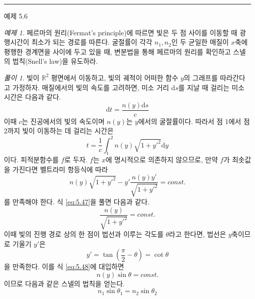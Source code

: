 \documentclass[chapter, oneside, b5paper]{oblivoir}
\theoremstyle{plain}
\theoremstyle{definition}
\theoremstyle{remark}
\newtheorem{example}{예제}[chapter]    %
\newtheorem*{solution}{풀이}
\begin{document}
\noindent\rule{\textwidth}{0.8pt} %
\vspace{1em} %

\begin{examplebox}{예제 5.6}
\begin{example}
페르마의 원리(Fermat's principle)에 따르면 빛은 두 점 사이를 이동할 때 광행시간이 최소가 되는 경로를 따른다. 굴절률이 각각 $n_1, n_2$인 두 균일한 매질이 $x$축에 평행한 경계면을 사이에 두고 있을 때, 변분법을 통해 페르마의 원리를 확인하고 스넬의 법칙(Snell's law)을 유도하라.
\end{example}
\end{examplebox}

\begin{solution}
    빛이 $\mathbb{R}^2$ 평면에서 이동하고, 빛의 궤적이 어떠한 함수 $y$의 그래프를 따라간다고 가정하자. 매질에서의 빛의 속도를 고려하면, 미소 거리 $\mathrm{d}s$를 지날 때 걸리는 미소 시간은 다음과 같다.
    \begin{equation}
        \mathrm{d}t = \frac{n(y)\mathrm{d}s}{c}
    \end{equation}
    이때 $c$는 진공에서의 빛의 속도이며 $n(y)$는 $y$에서의 굴절률이다. 따라서 점 1에서 점 2까지 빛이 이동하는 데 걸리는 시간은
    \begin{equation}
        t = \frac{1}{c} \int_1^2 n(y) \sqrt{1+{y'}^2} \mathrm{d}y
    \end{equation}
    이다. 피적분함수를 $f$로 두자. $f$는 $x$에 명시적으로 의존하지 않으므로, 만약 $f$가 최솟값을 가진다면 벨트라미 항등식에 따라
    \begin{equation}
        n(y)\sqrt{1+{y'}^2} - y' \frac{n(y)y'}{\sqrt{1+{y'}^2}} = const.
        \label{eq:5.47}
    \end{equation}
    를 만족해야 한다. 식 \ref{eq:5.47}을 풀면 다음과 같다.
    \begin{equation}
        \frac{n(y)}{\sqrt{1+{y'}^2}} = const.
        \label{eq:5.48}
    \end{equation}
    이때 빛의 진행 경로 상의 한 점이 법선과 이루는 각도를 $\theta$라고 한다면, 법선은 $y$축이므로 기울기 $y'$은
    \begin{equation}
        y' = \tan{\left(\frac{\pi}{2}-\theta \right)} = \cot{\theta}
    \end{equation}
    을 만족한다. 이를 식 \ref{eq:5.48}에 대입하면
    \begin{equation}
        n(y)\sin{\theta} = const. 
    \end{equation}
    이므로 다음과 같은 스넬의 법칙을 얻는다.
    \begin{equation}
         n_1\sin{\theta_1} = n_2\sin{\theta_2}
    \end{equation}
\end{solution}
\end{document}
